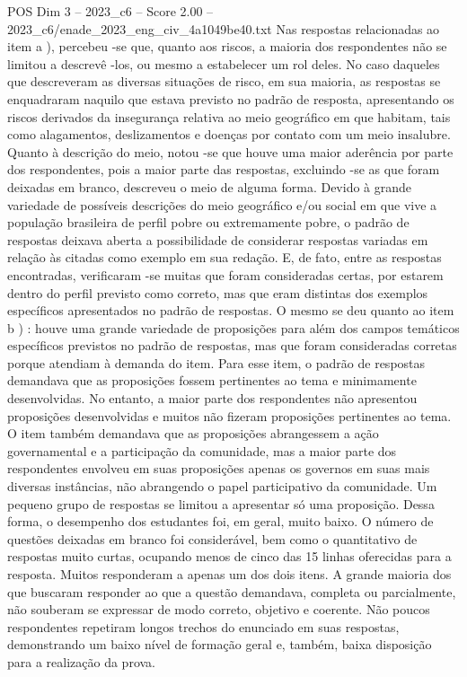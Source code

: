 \begin{textsample}{POS Dim 3 – 2023\_c6 – Score 2.00 – 2023\_c6/enade\_2023\_eng\_civ\_4a1049be40.txt}
Nas respostas relacionadas ao item a ), percebeu -se que, quanto aos riscos, a maioria dos respondentes não se limitou a descrevê -los, ou mesmo a estabelecer um rol deles.
No caso daqueles que descreveram as diversas situações de risco, em sua maioria, as respostas se enquadraram naquilo que estava previsto no padrão de resposta, apresentando os riscos derivados da insegurança relativa ao meio geográfico em que habitam, tais como alagamentos, deslizamentos e doenças por contato com um meio insalubre.
Quanto à descrição do meio, notou -se que houve uma maior aderência por parte dos respondentes, pois a maior parte das respostas, excluindo -se as que foram deixadas em branco, descreveu o meio de alguma forma.
Devido à grande variedade de possíveis descrições do meio geográfico e/ou social em que vive a população brasileira de perfil pobre ou extremamente pobre, o padrão de respostas deixava aberta a possibilidade de considerar respostas variadas em relação às citadas como exemplo em sua redação.
E, de fato, entre as respostas encontradas, verificaram -se muitas que foram consideradas certas, por estarem dentro do perfil previsto como correto, mas que eram distintas dos exemplos específicos apresentados no padrão de respostas.
O mesmo se deu quanto ao item b ) : houve uma grande variedade de proposições para além dos campos temáticos específicos previstos no padrão de respostas, mas que foram consideradas corretas porque atendiam à demanda do item.
Para esse item, o padrão de respostas demandava que as proposições fossem pertinentes ao tema e minimamente desenvolvidas.
No entanto, a maior parte dos respondentes não apresentou proposições desenvolvidas e muitos não fizeram proposições pertinentes ao tema.
O item também demandava que as proposições abrangessem a ação governamental e a participação da comunidade, mas a maior parte dos respondentes envolveu em suas proposições apenas os governos em suas mais diversas instâncias, não abrangendo o papel participativo da comunidade.
Um pequeno grupo de respostas se limitou a apresentar só uma proposição.
Dessa forma, o desempenho dos estudantes foi, em geral, muito baixo.
O número de questões deixadas em branco foi considerável, bem como o quantitativo de respostas muito curtas, ocupando menos de cinco das 15 linhas oferecidas para a resposta.
Muitos responderam a apenas um dos dois itens.
A grande maioria dos que buscaram responder ao que a questão demandava, completa ou parcialmente, não souberam se expressar de modo correto, objetivo e coerente.
Não poucos respondentes repetiram longos trechos do enunciado em suas respostas, demonstrando um baixo nível de formação geral e, também, baixa disposição para a realização da prova.

\end{textsample}

